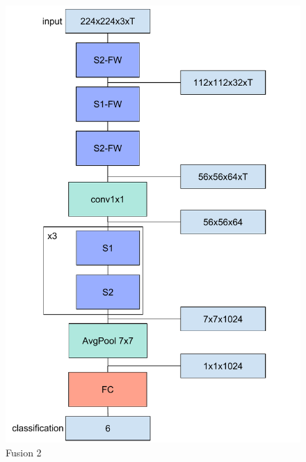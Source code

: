 \begin{figure}%
\includegraphics[width=\columnwidth]{figures/Reseau1Fusion2.pdf}%
\caption{Fusion 2}%
\label{fig:fusion2}%
\end{figure}


